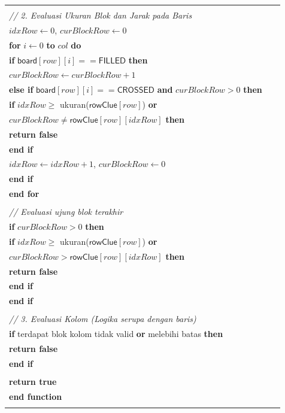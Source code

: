 \documentclass[conference]{IEEEtran}
\begin{document}
\begin{table}[H] 
\centering
\small 
\begin{tabular}{|p{0.95\linewidth}|} 
\hline
\vspace{-0.5em} \\ 
\quad \textit{// 2. Evaluasi Ukuran Blok dan Jarak pada Baris} \\
\quad $idxRow \leftarrow 0$, $curBlockRow \leftarrow 0$ \\
\quad \textbf{for} $i \leftarrow 0$ \textbf{to} $col$ \textbf{do} \\
\quad \quad \textbf{if} $\textsf{board}[row][i] == \textsf{FILLED}$ \textbf{then} \\
\quad \quad \quad $curBlockRow \leftarrow curBlockRow + 1$ \\
\quad \quad \textbf{else if} $\textsf{board}[row][i] == \textsf{CROSSED}$ \textbf{and} $curBlockRow > 0$ \textbf{then} \\
\quad \quad \quad \textbf{if} $idxRow \ge$ ukuran($\textsf{rowClue}[row]$) \textbf{or} \\
\quad \quad \quad $curBlockRow \neq \textsf{rowClue}[row][idxRow]$ \textbf{then} \\
\quad \quad \quad \quad \textbf{return false} \\
\quad \quad \quad \textbf{end if} \\
\quad \quad \quad $idxRow \leftarrow idxRow + 1$, $curBlockRow \leftarrow 0$ \\
\quad \quad \textbf{end if} \\
\quad \textbf{end for} \\
\\
\quad \textit{// Evaluasi ujung blok terakhir} \\
\quad \textbf{if} $curBlockRow > 0$ \textbf{then} \\
\quad \quad \textbf{if} $idxRow \ge$ ukuran($\textsf{rowClue}[row]$) \textbf{or} \\
\quad \quad $curBlockRow > \textsf{rowClue}[row][idxRow]$ \textbf{then} \\
\quad \quad \quad \textbf{return false} \\
\quad \quad \textbf{end if} \\
\quad \textbf{end if} \\
\\
\quad \textit{// 3. Evaluasi Kolom (Logika serupa dengan baris)} \\
\quad \textbf{if} terdapat blok kolom tidak valid \textbf{or} melebihi batas \textbf{then} \\
\quad \quad \textbf{return false} \\
\quad \textbf{end if} \\
\\
\quad \textbf{return true} \\
\textbf{end function} \\
\vspace{-0.5em} \\
\hline
\end{tabular}
\end{table}
\end{document}
